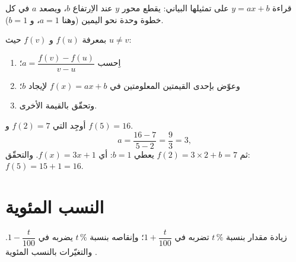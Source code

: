 \begin{omfigure}

{\small قراءة $y = ax + b$ على تمثيلها البياني: يقطع  محور
$y$ عند الاِرتفاع $b$، ويصعد $a$ في كل خطوة وحدة نحو اليمين (وهنا
$a = 1$، و $b = 1$).}
\end{omfigure}

\begin{method}\label{met:g9:linfunc:findaffine}
بمعرفة $f(u)$ و $f(v)$ حيث $u \neq v$:
\begin{enumerate}
  \item اِحسب  $a = \dfrac{f(v) - f(u)}{v - u}$؛
  \item وعوّض بإحدى القيمتين المعلومتين في $f(x) = ax + b$
        لإيجاد $b$؛
  \item وتحقّق بالقيمة الأخرى.
\end{enumerate}
\end{method}

\begin{example}\label{ex:g9:linfunc:findaffine}
أوجِد  التي $f(2) = 7$ و $f(5) = 16$.
\[
a = \frac{16 - 7}{5 - 2} = \frac93 = 3 ,
\]
ثم $f(2) = 3 \times 2 + b = 7$ يعطي $b = 1$: أي $f(x) = 3x + 1$.
والتحقّق: $f(5) = 15 + 1 = 16$.
\end{example}

\section{النسب المئوية}

\begin{proposition}\label{prop:g9:linfunc:percent}
زيادة مقدار بنسبة $t\,\%$ تضربه في $1 + \dfrac{t}{100}$؛ وإنقاصه
بنسبة $t\,\%$ يضربه في $1 - \dfrac{t}{100}$. والتغيّرات بالنسب
المئوية .
\end{proposition}


